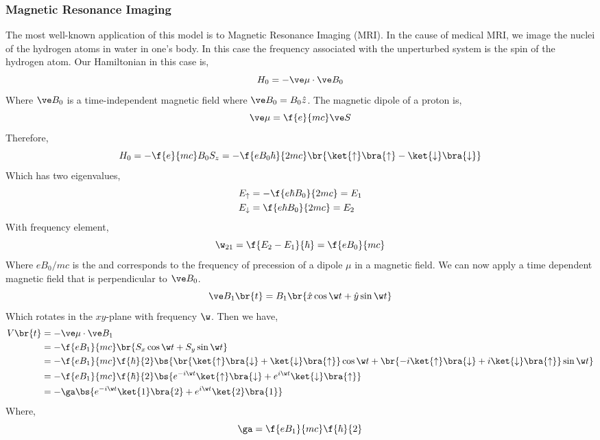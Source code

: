 \documentclass{article}
\begin{document}
\subsubsection{Magnetic Resonance Imaging}
The most well-known application of this model is to Magnetic Resonance Imaging (MRI). In the cause of medical MRI, we image the nuclei of the hydrogen atoms in water in one's body. In this case the frequency associated with the unperturbed system is the spin of the hydrogen atom. Our Hamiltonian in this case is,
\[ H_0 = - \ve \mu \cdot \ve B_0 \]
Where $\ve B_0$ is a time-independent magnetic field where $\ve B_0 = B_0 \hat z$. The magnetic dipole of a proton is,
\[ \ve \mu = \f{e}{mc} \ve S \]
Therefore,
\[ H_0 = -\f{e}{mc} B_0 S_z = -\f{e B_0 \hbar}{2mc} \br{\ket{\uparrow} \bra{\uparrow} - \ket{\downarrow} \bra{\downarrow}}\]
Which has two eigenvalues,
\begin{align*}
    E_{\uparrow}&= - \f{e \hbar B_0}{2mc} = E_1 \\
    E_{\downarrow}&= \f{e \hbar B_0}{2mc} = E_2
\end{align*}
With frequency element,
\[ \w_{21} = \f{E_2- E_1}{\hbar} = \f{eB_0}{mc} \]
Where $eB_0/mc$ is the  and corresponds to the frequency of precession of  a dipole $\mu$ in a magnetic field. We can now apply a time dependent magnetic field that is perpendicular to $\ve B_0$.
\[ \ve B_1\br{t} = B_1 \br{\hat x \cos \w t + \hat y \sin \w t} \]
Which rotates in the $xy$-plane with frequency $\w$. Then we have,
\begin{align*}
    V\br{t}
    &= - \ve \mu \cdot \ve B_1 \\
    &= - \f{eB_1}{mc}\br{S_x \cos \w t + S_y \sin \w t} \\
    &= - \f{eB_1}{mc} \f{\hbar}{2} \bs{\br{\ket{\uparrow}\bra{\downarrow} + \ket{\downarrow}\bra{\uparrow}} \cos \w t + \br{-i\ket{\uparrow}\bra{\downarrow} + i\ket{\downarrow}\bra{\uparrow}} \sin \w t} \\
    &= - \f{eB_1}{mc} \f{\hbar}{2} \bs{e^{-i \w t}\ket{\uparrow}\bra{\downarrow} + e^{i \w t}\ket{\downarrow}\bra{\uparrow}} \\
    &= - \ga \bs{e^{-i \w t}\ket{1}\bra{2} + e^{i \w t}\ket{2}\bra{1}} \\
\end{align*}
Where,
\[ \ga = \f{eB_1}{mc} \f{\hbar}{2} \]
\end{document}
